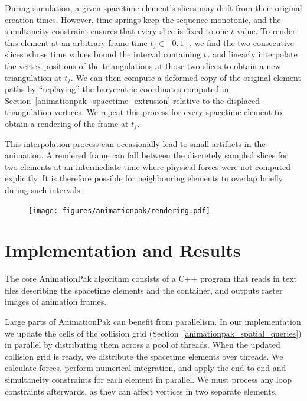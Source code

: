 During simulation, a given spacetime element's slices may drift from their
original creation times.  However, time springs keep the sequence
monotonic, and the simultaneity constraint ensures that every slice
is fixed to one $t$ value.  To render this element at an arbitrary
frame time $t_f\in[0,1]$, we find the two consecutive slices whose
time values
bound the interval containing $t_f$ and linearly interpolate the vertex
positions of the triangulations at those two slices to obtain a new
triangulation at $t_f$.  We can then compute a deformed copy of the
original element paths by ``replaying'' the barycentric coordinates 
computed in Section~\ref{animationpak_spacetime_extrusion} relative to the displaced
triangulation vertices.  We repeat this process for every spacetime element
to obtain a rendering of the frame at $t_f$.

This interpolation process can occasionally lead to small artifacts in 
the animation.  A rendered frame can fall between
the discretely sampled slices for two elements at an intermediate time
where physical forces were not computed explicitly.  It is therefore
possible for neighbouring elements to overlap briefly during such intervals.

\begin{figure}
\centering
\texttt{[image: figures/animationpak/rendering.pdf]} 
\caption[An illustration of rendering spacetime elements]
{\label{fig_animationpak_render} 
}
\end{figure}


\section{Implementation and Results}
\label{animationpak_implementation_and_results}


The core AnimationPak algorithm consists of a C++ program that reads 
in text files describing the spacetime elements and the container, 
and outputs raster images of animation frames.

Large parts of AnimationPak can benefit from parallelism.  In
our implementation we update the cells of the collision grid
(Section~\ref{animationpak_spatial_queries}) in parallel by distributing them
across a pool of threads.  When the updated collision grid is ready,
we distribute the spacetime elements over threads.  We calculate
forces, perform numerical integration, and apply the end-to-end and
simultaneity constraints for each element in parallel.  We must
process any loop constraints afterwards, as they can affect vertices in
two separate elements.

